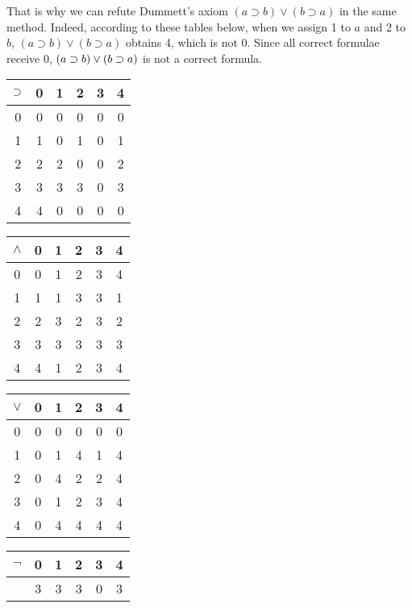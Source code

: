 That is why we can refute Dummett's axiom $(a\supset b)\lor (b\supset
a)$ in the same method.
Indeed, according to these tables below, when we assign 1 to $a$ and 2
to $b$, $(a\supset b)\lor (b\supset a)$ obtains 4, which is not 0.
Since all correct formulae receive 0, $(a\supset b)\lor (b\supset a)$ is not a
correct formula.
 \begin{center}
  \begin{tabular}{c|ccccc}
   $\supset$ & 0& 1& 2& 3& 4\\ \hline
   0& 0& 0& 0& 0& 0\\
   1& 1& 0& 1& 0& 1\\
   2& 2& 2& 0& 0& 2\\
   3& 3& 3& 3& 0& 3\\
   4& 4& 0& 0& 0& 0
  \end{tabular}
  \hfill
  \begin{tabular}{c|ccccc}
   $\wedge$& 0& 1& 2& 3& 4\\ \hline
   0 & 0& 1& 2& 3& 4\\
   1& 1& 1& 3& 3& 1\\
   2& 2& 3& 2& 3& 2\\
   3& 3& 3& 3& 3& 3\\
   4& 4& 1& 2& 3& 4\\
  \end{tabular}
  \begin{tabular}{c|ccccc}
   $\vee$&0 &1 &2 &3 &4 \\ \hline
   0& 0& 0& 0& 0& 0\\
   1& 0& 1& 4& 1& 4\\
   2& 0& 4& 2& 2& 4\\
   3& 0& 1& 2& 3& 4\\
   4& 0& 4& 4& 4& 4\\
  \end{tabular}
  \hfill
  \begin{tabular}{c|ccccc}
   $\neg$& 0& 1& 2& 3& 4\\ \hline
   & 3& 3& 3& 0& 3\\
  \end{tabular}
 \end{center}

